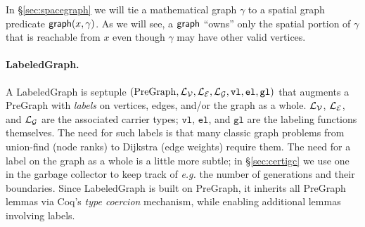 \hide
{In \S\ref{sec:spacegraph} we will tie a mathematical graph $\gamma$ to
a spatial graph predicate
$\mathsf{graph}(x, \gamma)$.   As we will see, a $\mathsf{graph}$ ``owns'' only the
spatial portion of $\gamma$ that is reachable
from $x$ even though $\gamma$ may have other valid vertices.
} %



\vspace{-0.75ex}

\paragraph{LabeledGraph.}
A LabeledGraph is septuple $(\mathrm{PreGraph},\mathcal{L_{V}},\mathcal{L_{E}},\mathcal{L_{G}}, \mathtt{vl},\mathtt{el},\mathtt{gl})$ that augments a PreGraph with \emph{labels} on
vertices, edges, and/or the graph as a whole. $\mathcal{L_{V}}$, $\mathcal{L_{E}}$, and $\mathcal{L_{G}}$
are the associated carrier types; $\mathtt{vl}$, $\mathtt{el}$, and $\mathtt{gl}$
are the labeling functions themselves.
The need for such labels is that many classic graph problems from union-find (node ranks) 
to Dijkstra (edge weights) require them.  The need for a label on the graph as a whole
is a little more subtle; in \S\ref{sec:certigc} we use one in the garbage collector 
to keep track of \emph{e.g.} the number of generations and their boundaries.
Since LabeledGraph is built on PreGraph, it inherits all PreGraph lemmas via
Coq's \emph{type coercion} mechanism, while enabling additional lemmas involving labels.




